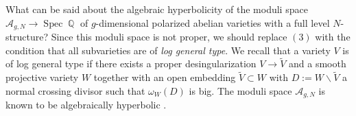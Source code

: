 \documentclass[11pt]{amsart}
\numberwithin{subsection}{section}
\numberwithin{figure}{section}
\numberwithin{table}{section}
\theoremstyle{1}
\theoremstyle{2}
\DeclareMathOperator{\Q}{\mathbb{Q}}
\DeclareMathOperator{\Spec}{Spec}
\begin{document}
What can be said about the algebraic hyperbolicity of the moduli space $\mathcal{A}_{g,N} \rightarrow \Spec \Q$ of $g$-dimensional polarized abelian varieties with a full level $N$-structure? Since this moduli space is not proper, we should replace $(3)$ with the condition that all subvarieties are of \emph{log general type}. We recall that a variety $V$ is of log general type if there exists a proper desingularization $V \rightarrow \tilde{V}$ and a smooth projective variety $W$ together with an open embedding $\tilde{V} \subset W$ with $D := W \smallsetminus \tilde{V}$ a normal crossing divisor such that $\omega_{W}(D)$ is big. The moduli space $\mathcal{A}_{g,N}$ is known to be algebraically hyperbolic \cite{MR1803724} \cite{MR3859271}.
\end{document}
